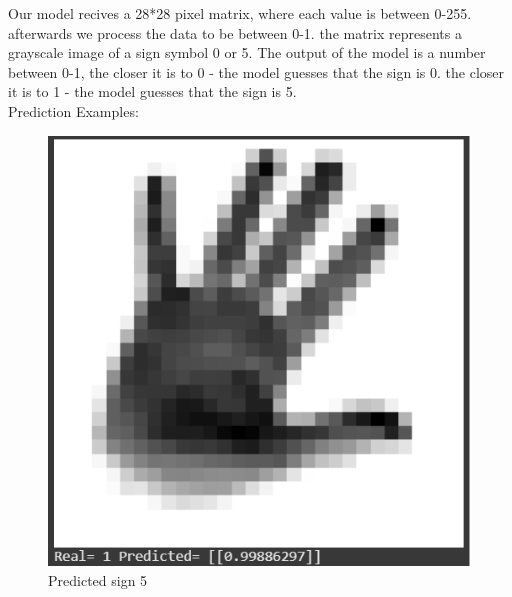 \documentclass{article}
\begin{document}
Our model recives a 28*28 pixel matrix, where each value is between 0-255. afterwards we process the data to be between 0-1. the matrix represents a grayscale image of a sign symbol 0 or 5. The output of the model is a number between 0-1, the closer it is to 0 - the model guesses that the sign is 0. the closer it is to 1 - the model guesses that the sign is 5. \\
Prediction Examples:
\begin{figure}[H]
    \begin{minipage}[b]{0.45\textwidth} %
        \centering
        \includegraphics[width=\textwidth]{figures/predictedOne.png}
        \caption{Predicted sign 5}
        \label{fig:predictedOne}
    \end{minipage}
    \hfill %
    \begin{minipage}[b]{0.45\textwidth} %
        \centering

\end{minipage}
\end{figure}
\end{document}
